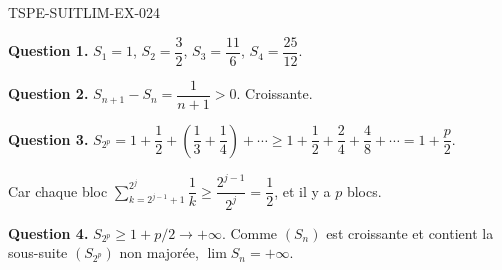 \begin{corrige}{TSPE-SUITLIM-EX-024}

\textbf{Question 1.} $S_1 = 1$, $S_2 = \dfrac{3}{2}$, $S_3 = \dfrac{11}{6}$, $S_4 = \dfrac{25}{12}$.

\textbf{Question 2.} $S_{n+1} - S_n = \dfrac{1}{n+1} > 0$. Croissante.

\textbf{Question 3.} $S_{2^p} = 1 + \dfrac{1}{2} + \left(\dfrac{1}{3}+\dfrac{1}{4}\right) + \cdots \geq 1 + \dfrac{1}{2} + \dfrac{2}{4} + \dfrac{4}{8} + \cdots = 1 + \dfrac{p}{2}$.

Car chaque bloc $\sum_{k=2^{j-1}+1}^{2^j} \dfrac{1}{k} \geq \dfrac{2^{j-1}}{2^j} = \dfrac{1}{2}$, et il y a $p$ blocs.

\textbf{Question 4.} $S_{2^p} \geq 1 + p/2 \to +\infty$. Comme $(S_n)$ est croissante et contient la sous-suite $(S_{2^p})$ non majorée, $\boxed{\lim S_n = +\infty}$.

\end{corrige}
